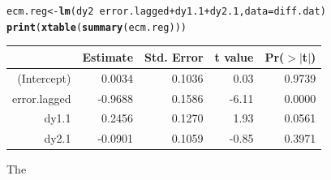 \documentclass{article}\usepackage{graphicx, color}
\makeatletter
\newcommand{\hlfunctioncall}[1]{\textcolor[rgb]{0.501960784313725,0,0.329411764705882}{\textbf{#1}}}%
\newenvironment{kframe}{%
 \def\at@end@of@kframe{}%
 \ifinner\ifhmode%
  \def\at@end@of@kframe{\end{minipage}}%
  \begin{minipage}{\columnwidth}%
 \fi\fi%
 \def\FrameCommand##1{\hskip\@totalleftmargin \hskip-\fboxsep
 \colorbox{shadecolor}{##1}\hskip-\fboxsep
     \hskip-\linewidth \hskip-\@totalleftmargin \hskip\columnwidth}%
 \MakeFramed {\advance\hsize-\width
   \@totalleftmargin\z@ \linewidth\hsize
   \@setminipage}}%
 {\par\unskip\endMakeFramed%
 \at@end@of@kframe}
\makeatother
\begin{document}
\begin{kframe}
\begin{alltt}
ecm.reg <- \hlfunctioncall{lm}(dy2 ~ error.lagged + dy1.1 + dy2.1, data = diff.dat)
\hlfunctioncall{print}(\hlfunctioncall{xtable}(\hlfunctioncall{summary}(ecm.reg)))
\end{alltt}
\end{kframe}%
\begin{table}[ht]
\begin{center}
\begin{tabular}{rrrrr}
  \hline
 & Estimate & Std. Error & t value & Pr($>$$|$t$|$) \\ 
  \hline
(Intercept) & 0.0034 & 0.1036 & 0.03 & 0.9739 \\ 
  error.lagged & -0.9688 & 0.1586 & -6.11 & 0.0000 \\ 
  dy1.1 & 0.2456 & 0.1270 & 1.93 & 0.0561 \\ 
  dy2.1 & -0.0901 & 0.1059 & -0.85 & 0.3971 \\ 
   \hline
\end{tabular}
\end{center}
\end{table}


The
\newpage


\end{document}
